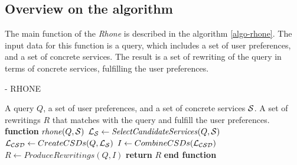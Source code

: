 

\subsection{Overview on the algorithm}
The main function of the \textit{Rhone} is described in the algorithm
\ref{algo-rhone}.
The input data for this function is a query, which includes a set of user preferences, and a set of concrete services. The result is a set of rewriting of the query in terms of concrete services, fulfilling the user preferences.

\begin{algorithm}
\small
\caption{ - RHONE}
\label{algo-rhone}
\begin{algorithmic}[1]
\REQUIRE A query $Q$, a set of user preferences, and a set of concrete services $\hbox{${\cal S}$}$.
\ENSURE A set of rewritings $R$ that matches with the query and fulfill the user preferences.
\STATE \textbf{function} $\mathit{rhone} (Q, \hbox{${\cal S}$})$
 \STATE  $\hbox{${\cal L_{S}}$} \leftarrow \mathit{SelectCandidateServices}(Q, \hbox{${\cal S}$})$ \label{rhone:buildPCD}
 \STATE  $\hbox{${\cal L_{CSD}}$} \leftarrow CreateCSDs(Q, \hbox{${\cal L_{S}}$})$
 \STATE  $I \leftarrow CombineCSDs(\hbox{${\cal L_{CSD}}$})$
 \STATE $R\leftarrow ProduceRewritings(Q, I)$
    \STATE \textbf{return} $R$
\STATE \textbf{end function}
\end{algorithmic}
\end{algorithm}

